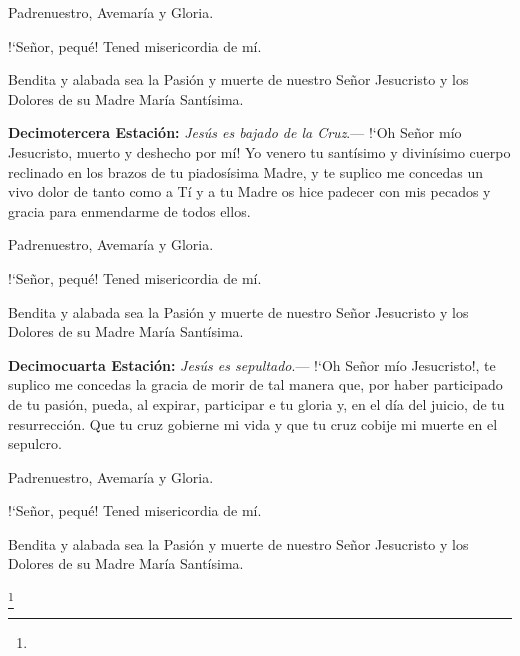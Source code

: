 \vspace{2mm}

Padrenuestro, Avemaría y Gloria.

{!`}Señor, pequé! Tened misericordia de mí.

Bendita y alabada sea la Pasión y muerte de nuestro Señor Jesucristo y los Dolores de su Madre María Santísima.

\vspace{2mm}

\textbf{Decimotercera Estación:} \textit{Jesús es bajado de la Cruz}.--- {!`}Oh Señor mío Jesucristo, muerto y deshecho por mí! Yo venero tu santísimo y divinísimo cuerpo reclinado en
los brazos de tu piadosísima Madre, y te suplico me concedas un vivo dolor de tanto como a Tí y a tu Madre os hice padecer con mis pecados y gracia para enmendarme de todos ellos.

\vspace{2mm}

Padrenuestro, Avemaría y Gloria.

{!`}Señor, pequé! Tened misericordia de mí.

Bendita y alabada sea la Pasión y muerte de nuestro Señor Jesucristo y los Dolores de su Madre María Santísima.

\vspace{2mm}

\textbf{Decimocuarta Estación:} \textit{Jesús es sepultado}.--- {!`}Oh Señor mío Jesucristo!, te suplico me concedas la gracia de morir de tal manera que, por haber participado de tu pasión,
pueda, al expirar, participar e tu gloria y, en el día del juicio, de tu resurrección. Que tu cruz gobierne mi vida y que tu cruz cobije mi muerte en el sepulcro.

\vspace{2mm}

Padrenuestro, Avemaría y Gloria.

{!`}Señor, pequé! Tened misericordia de mí.

Bendita y alabada sea la Pasión y muerte de nuestro Señor Jesucristo y los Dolores de su Madre María Santísima.

\vspace{2mm}

\footnote{}